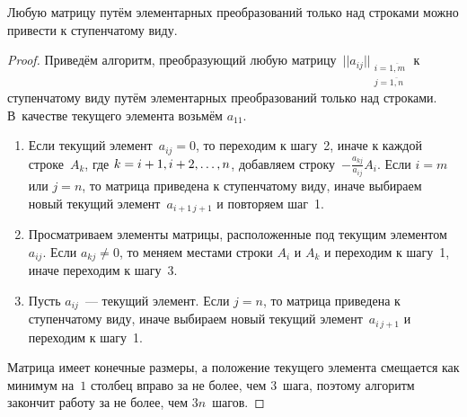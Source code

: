 \begin{theorem}
Любую матрицу путём элементарных преобразований только над строками можно привести к ступенчатому виду.
\end{theorem}
\begin{proof}
Приведём алгоритм, преобразующий любую матрицу~$||a_{ij}||_{\begin{smallmatrix}
i = \overline{1,m} \\
j = \overline{1,n}
\end{smallmatrix}}$ к ступенчатому виду путём элементарных преобразований только над строками.
В~качестве текущего элемента возьмём $a_{11}$.
\begin{enumerate}
	\item Если текущий элемент~$a_{ij} = 0$, то переходим к шагу~2, иначе к каждой строке~$A_k$, где $k \opbr= i + 1, i + 2, \ldots, n$, добавляем строку~$-\frac{a_{kj}}{a_{ij}} A_i$.
	Если $i = m$ или $j = n$, то матрица приведена к ступенчатому виду, иначе выбираем новый текущий элемент~$a_{i+1\, j+1}$ и повторяем шаг~1.
	\item Просматриваем элементы матрицы, расположенные под текущим элементом~$a_{ij}$.
	Если $a_{kj} \neq 0$, то меняем местами строки $A_i$ и $A_k$ и переходим к шагу~1, иначе переходим к шагу~3.
	\item Пусть $a_{ij}$~--- текущий элемент.
	Если $j = n$, то матрица приведена к ступенчатому виду, иначе выбираем новый текущий элемент~$a_{i\, j + 1}$ и переходим к шагу~1.
\end{enumerate}

Матрица имеет конечные размеры, а положение текущего элемента смещается как минимум на~$1$ столбец вправо за не более, чем $3$~шага, поэтому алгоритм закончит работу за не более, чем $3n$~шагов.
\end{proof}